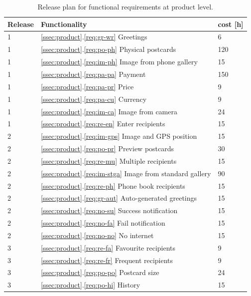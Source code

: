 \documentclass[10pt,a4paper]{article}
\begin{document}
\begin{table}[h!]
\centering
\caption{Release plan for functional requirements at product level.}
\label{table:release}
\begin{tabular}{| l | l | l | } \hline
\textbf{Release} & \textbf{Functionality} & \textbf{cost [h]} \\ \hline
1 & \ref{ssec:product}.\ref{req:gr-wr} Greetings & 6\\ \hline
1 & \ref{ssec:product}.\ref{req:po-ph} Physical postcards & 120\\ \hline
1 & \ref{ssec:product}.\ref{req:im-ph} Image from phone gallery & 15\\ \hline
1 & \ref{ssec:product}.\ref{req:pa-pa} Payment & 150\\ \hline
1 & \ref{ssec:product}.\ref{req:pa-pr} Price & 9 \\ \hline
1 & \ref{ssec:product}.\ref{req:pa-cu} Currency & 9 \\ \hline
1 & \ref{ssec:product}.\ref{req:im-ca} Image from camera & 24\\ \hline
1 & \ref{ssec:product}.\ref{req:re-en} Enter recipients & 15\\ \hline
2 & \ref{ssec:product}.\ref{req:im-gps} Image and GPS position & 15\\ \hline
2 & \ref{ssec:product}.\ref{req:po-pr} Preview postcards & 30\\ \hline
2 & \ref{ssec:product}.\ref{req:re-mu} Multiple recipients & 15\\ \hline
2 & \ref{ssec:product}.\ref{req:im-stga} Image from standard gallery & 90\\ \hline
2 & \ref{ssec:product}.\ref{req:re-ph} Phone book recipients & 15\\ \hline
2 & \ref{ssec:product}.\ref{req:gr-aut} Auto-generated greetings & 15\\ \hline
2 & \ref{ssec:product}.\ref{req:no-su} Success notification & 15 \\ \hline
2 & \ref{ssec:product}.\ref{req:no-fa} Fail notification & 15\\ \hline
2 & \ref{ssec:product}.\ref{req:no-no} No internet & 15\\ \hline
3 & \ref{ssec:product}.\ref{req:re-fa} Favourite recipients & 9\\ \hline
3 & \ref{ssec:product}.\ref{req:re-fr} Frequent recipients & 9\\ \hline
3 & \ref{ssec:product}.\ref{req:po-po} Postcard size & 24\\ \hline
3 & \ref{ssec:product}.\ref{req:po-hi} History & 15\\ \hline

\end{tabular}
\end{table}
\end{document}

